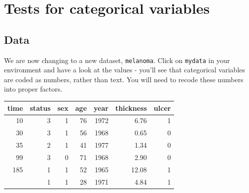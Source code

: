 \documentclass[12pt,]{krantz}
\makeatletter
\newenvironment{Shaded}{\begin{snugshade}}{\end{snugshade}}
\newcommand{\DataTypeTok}[1]{\textcolor[rgb]{0.13,0.29,0.53}{#1}}
\newcommand{\DecValTok}[1]{\textcolor[rgb]{0.00,0.00,0.81}{#1}}
\newcommand{\KeywordTok}[1]{\textcolor[rgb]{0.13,0.29,0.53}{\textbf{#1}}}
\newcommand{\NormalTok}[1]{#1}
\newcommand{\OperatorTok}[1]{\textcolor[rgb]{0.81,0.36,0.00}{\textbf{#1}}}
\newcommand{\OtherTok}[1]{\textcolor[rgb]{0.56,0.35,0.01}{#1}}
\newcommand{\StringTok}[1]{\textcolor[rgb]{0.31,0.60,0.02}{#1}}
\newenvironment{kframe}{%
\medskip{}
\setlength{\fboxsep}{.8em}
 \def\at@end@of@kframe{}%
 \ifinner\ifhmode%
  \def\at@end@of@kframe{\end{minipage}}%
  \begin{minipage}{\columnwidth}%
 \fi\fi%
 \def\FrameCommand##1{\hskip\@totalleftmargin \hskip-\fboxsep
 \colorbox{shadecolor}{##1}\hskip-\fboxsep
     \hskip-\linewidth \hskip-\@totalleftmargin \hskip\columnwidth}%
 \MakeFramed {\advance\hsize-\width
   \@totalleftmargin\z@ \linewidth\hsize
   \@setminipage}}%
 {\par\unskip\endMakeFramed%
 \at@end@of@kframe}
\renewenvironment{Shaded}{\begin{kframe}}{\end{kframe}}
\theoremstyle{definition}
\theoremstyle{definition}
\theoremstyle{definition}
\theoremstyle{remark}
\makeatother
\begin{document}
\hypertarget{tests-for-categorical-variables}{%
\chapter{Tests for categorical
variables}\label{tests-for-categorical-variables}}

\hypertarget{data-3}{%
\section{Data}\label{data-3}}

We are now changing to a new dataset, \texttt{melanoma}. Click on
\texttt{mydata} in your environment and have a look at the values -
you'll see that categorical variables are coded as numbers, rather than
text. You will need to recode these numbers into proper factors.

\begin{Shaded}
\end{Shaded}

\begin{table}[H]
\centering\begingroup\fontsize{7}{9}\selectfont

\begin{tabular}{rrrrrrr}
\toprule
time & status & sex & age & year & thickness & ulcer\\
\midrule
10 & 3 & 1 & 76 & 1972 & 6.76 & 1\\
30 & 3 & 1 & 56 & 1968 & 0.65 & 0\\
35 & 2 & 1 & 41 & 1977 & 1.34 & 0\\
99 & 3 & 0 & 71 & 1968 & 2.90 & 0\\
185 & 1 & 1 & 52 & 1965 & 12.08 & 1\\
\addlinespace
204 & 1 & 1 & 28 & 1971 & 4.84 & 1\\
\bottomrule
\end{tabular}
\endgroup{}
\end{table}
\end{document}
